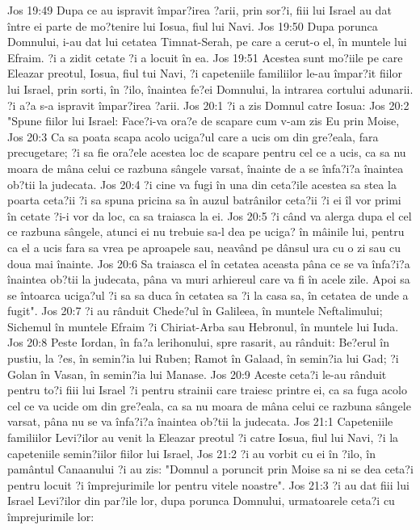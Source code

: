 Jos 19:49  Dupa ce au ispravit împar?irea ?arii, prin sor?i, fiii lui Israel au dat între ei parte de mo?tenire lui Iosua, fiul lui Navi.
Jos 19:50  Dupa porunca Domnului, i-au dat lui cetatea Timnat-Serah, pe care a cerut-o el, în muntele lui Efraim. ?i a zidit cetate ?i a locuit în ea.
Jos 19:51  Acestea sunt mo?iile pe care Eleazar preotul, Iosua, fiul tui Navi, ?i capeteniile familiilor le-au împar?it fiilor lui Israel, prin sorti, în ?ilo, înaintea fe?ei Domnului, la intrarea cortului adunarii. ?i a?a s-a ispravit împar?irea ?arii.
Jos 20:1  ?i a zis Domnul catre Iosua:
Jos 20:2  "Spune fiilor lui Israel: Face?i-va ora?e de scapare cum v-am zis Eu prin Moise,
Jos 20:3  Ca sa poata scapa acolo uciga?ul care a ucis om din gre?eala, fara precugetare; ?i sa fie ora?ele acestea loc de scapare pentru cel ce a ucis, ca sa nu moara de mâna celui ce razbuna sângele varsat, înainte de a se înfa?i?a înaintea ob?tii la judecata.
Jos 20:4  ?i cine va fugi în una din ceta?ile acestea sa stea la poarta ceta?ii ?i sa spuna pricina sa în auzul batrânilor ceta?ii ?i ei îl vor primi în cetate ?i-i vor da loc, ca sa traiasca la ei.
Jos 20:5  ?i când va alerga dupa el cel ce razbuna sângele, atunci ei nu trebuie sa-l dea pe uciga? în mâinile lui, pentru ca el a ucis fara sa vrea pe aproapele sau, neavând pe dânsul ura cu o zi sau cu doua mai înainte.
Jos 20:6  Sa traiasca el în cetatea aceasta pâna ce se va înfa?i?a înaintea ob?tii la judecata, pâna va muri arhiereul care va fi în acele zile. Apoi sa se întoarca uciga?ul ?i sa sa duca în cetatea sa ?i la casa sa, în cetatea de unde a fugit".
Jos 20:7  ?i au rânduit Chede?ul în Galileea, în muntele Neftalimului; Sichemul în muntele Efraim ?i Chiriat-Arba sau Hebronul, în muntele lui Iuda.
Jos 20:8  Peste Iordan, în fa?a lerihonului, spre rasarit, au rânduit: Be?erul în pustiu, la ?es, în semin?ia lui Ruben; Ramot în Galaad, în semin?ia lui Gad; ?i Golan în Vasan, în semin?ia lui Manase.
Jos 20:9  Aceste ceta?i le-au rânduit pentru to?i fiii lui Israel ?i pentru strainii care traiesc printre ei, ca sa fuga acolo cel ce va ucide om din gre?eala, ca sa nu moara de mâna celui ce razbuna sângele varsat, pâna nu se va înfa?i?a înaintea ob?tii la judecata.
Jos 21:1  Capeteniile familiilor Levi?ilor au venit la Eleazar preotul ?i catre Iosua, fiul lui Navi, ?i la capeteniile semin?iilor fiilor lui Israel,
Jos 21:2  ?i au vorbit cu ei în ?ilo, în pamântul Canaanului ?i au zis: "Domnul a poruncit prin Moise sa ni se dea ceta?i pentru locuit ?i împrejurimile lor pentru vitele noastre".
Jos 21:3  ?i au dat fiii lui Israel Levi?ilor din par?ile lor, dupa porunca Domnului, urmatoarele ceta?i cu împrejurimile lor:
